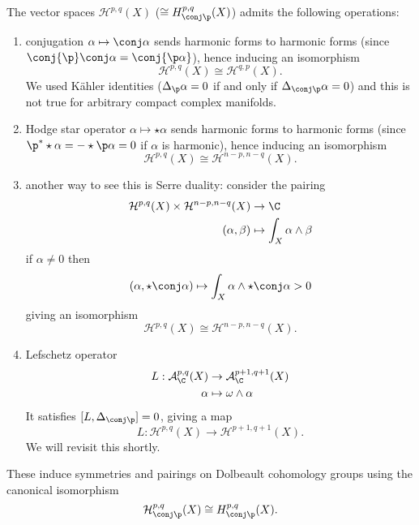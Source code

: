 \documentclass[a4paper]{article}
\newcommand{\w}{\wedge} %
\begin{document}
\begin{remark}
  The vector spaces \(\mathcal H^{p, q}(X)\) (\(\cong H_{\conj \p}^{p, q}(X)\)) admits the following operations:
  \begin{enumerate}
  \item conjugation \(\alpha \mapsto \conj \alpha\) sends harmonic forms to harmonic forms (since \(\conj{\p} \conj \alpha = \conj{\p \alpha}\)), hence inducing an isomorphism
    \[
      \mathcal H^{p, q}(X) \cong \mathcal H^{q, p}(X).
    \]
    We used Kähler identities (\(\Delta_\p \alpha = 0\) if and only if \(\Delta_{\conj \p} \alpha = 0\)) and this is not true for arbitrary compact complex manifolds.
  \item Hodge star operator \(\alpha \mapsto \star \alpha\) sends harmonic forms to harmonic forms (since \(\p^* \star \alpha = - \star \p \alpha = 0\) if \(\alpha\) is harmonic), hence inducing an isomorphism
    \[
      \mathcal H^{p, q}(X) \cong \mathcal H^{n - p, n - q}(X).
    \]
  \item another way to see this is Serre duality: consider the pairing
    \begin{align*}
      \mathcal H^{p, q}(X) \times \mathcal H^{n - p, n - q}(X) &\to \C \\
      (\alpha, \beta) &\mapsto \int_X \alpha \w \beta
    \end{align*}
    if \(\alpha \neq 0\) then
    \[
      (\alpha, \star \conj \alpha) \mapsto \int_X \alpha \w \star \conj \alpha > 0
    \]
    giving an isomorphism
    \[
      \mathcal H^{p, q}(X) \cong \mathcal H^{n - p, n - q}(X).
    \]
  \item Lefschetz operator
    \begin{align*}
      L: \mathcal A_\C^{p, q}(X) &\to \mathcal A_\C^{p + 1, q + 1}(X) \\
      \alpha &\mapsto \omega \w \alpha
    \end{align*}
    It satisfies \([L, \Delta_{\conj \p}] = 0\), giving a map
    \[
      L: \mathcal H^{p, q}(X) \to \mathcal H^{p + 1, q + 1}(X).
    \]
    We will revisit this shortly.
  \end{enumerate}
  These induce symmetries and pairings on Dolbeault cohomology groups using the canonical isomorphism
  \[
    \mathcal H_{\conj \p}^{p, q}(X) \cong H_{\conj \p}^{p, q}(X).
  \]
\end{remark}
\end{document}
